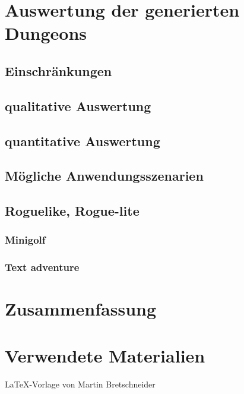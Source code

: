 \chapter{Auswertung der generierten Dungeons}

\section{Einschränkungen}


\section{qualitative Auswertung}

\section{quantitative Auswertung}

\section{Mögliche Anwendungsszenarien}

\section{Roguelike, Rogue-lite}

\subsection{Minigolf}

\subsection{Text adventure}


\chapter{Zusammenfassung}\label{c.zusammenfassung}


\chapter*{Verwendete Materialien}
\LaTeX -Vorlage von Martin Bretschneider \cite{thesislatex}




